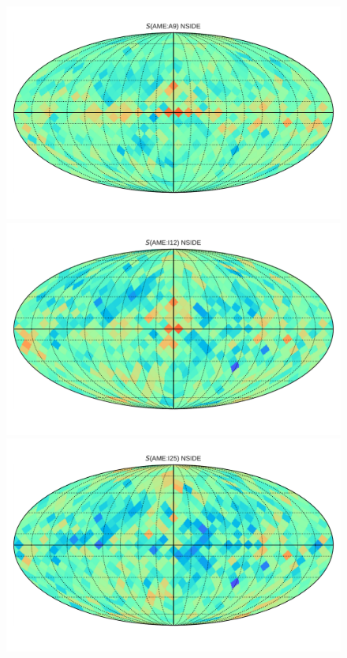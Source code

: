       \begin{figure}
        \includegraphics[width=\textwidth/3]{../Plots/Allsky_Corr/RadNorm/Spearman_Map_nside8_AMEtoA9.pdf}
        \includegraphics[width=\textwidth/3]{../Plots/Allsky_Corr/RadNorm/Spearman_Map_nside8_AMEtoI12.pdf}
        \includegraphics[width=\textwidth/3]{../Plots/Allsky_Corr/RadNorm/Spearman_Map_nside8_AMEtoI25.pdf}

\end{figure}

